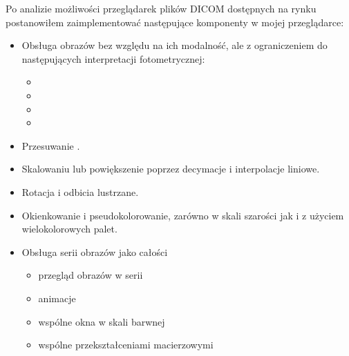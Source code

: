 
\par
Po analizie możliwości przeglądarek plików DICOM dostępnych na rynku postanowiłem zaimplementować następujące komponenty w mojej przeglądarce:
\begin{itemize}
    \item Obsługa obrazów bez względu na ich modalność, ale z ograniczeniem do następujących interpretacji fotometrycznej:

          \begin{itemize}
              \item {}
              \item {}
              \item {}
              \item {}
          \end{itemize}

    \item Przesuwanie .

    \item Skalowaniu lub powiększenie poprzez decymacje i interpolacje liniowe.

    \item Rotacja i odbicia lustrzane.

    \item Okienkowanie i pseudokolorowanie, zarówno w skali szarości jak i z użyciem wielokolorowych palet.

    \item Obsługa serii obrazów jako całości
          \begin{itemize}
              \item przegląd obrazów w serii
              \item animacje
              \item wspólne okna w skali barwnej
              \item wspólne przekształceniami macierzowymi
          \end{itemize}
\end{itemize}
